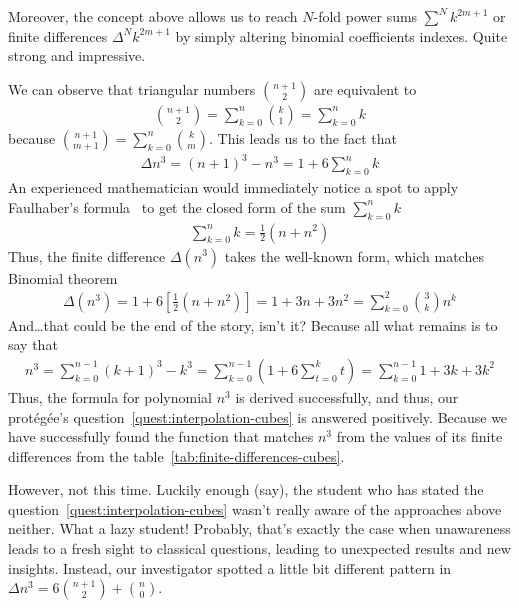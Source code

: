 Moreover, the concept above allows us to reach $N$-fold power sums $\sum^N k^{2m+1}$
or finite differences $\Delta^N k^{2m+1}$ by simply altering
binomial coefficients indexes.
Quite strong and impressive.

We can observe that triangular numbers $\binom{n+1}{2}$ are equivalent to
\begin{align*}
    \binom{n+1}{2} = \sum_{k=0}^{n} \binom{k}{1} = \sum_{k=0}^{n} k
\end{align*}
because $\binom{n+1}{m+1} = \sum_{k=0}^{n} \binom{k}{m}$.
This leads us to the fact that
\begin{align*}
    \Delta n^3 = (n+1)^3 - n^3 = 1 + 6 \sum_{k=0}^{n} k
\end{align*}
An experienced mathematician would immediately notice a spot to apply Faulhaber's formula~\cite{beardon1996sums}
to get the closed form of the sum $\sum_{k=0}^{n} k$
\begin{align*}
    \sum_{k=0}^{n} k = \frac{1}{2}(n+n^2)
\end{align*}
Thus, the finite difference $\Delta(n^3)$ takes the well-known form,
which matches Binomial theorem~\cite{abramowitz1988handbook}
\begin{align*}
    \Delta(n^3)
    = 1 + 6 \left[ \frac{1}{2}(n+n^2) \right]
    = 1 + 3 n + 3 n^2
    = \sum_{k=0}^{2} \binom{3}{k} n^k
\end{align*}
And\ldots that could be the end of the story, isn't it?
Because all what remains is to say that
\begin{align*}
    n^3
    = \sum_{k=0}^{n-1} (k+1)^3 - k^3
    = \sum_{k=0}^{n-1} \left( 1 + 6 \sum_{t=0}^{k} t \right)
    = \sum_{k=0}^{n-1} 1 + 3 k + 3 k^2
\end{align*}
Thus, the formula for polynomial $n^3$ is derived successfully, and thus,
our protégée's question~\eqref{quest:interpolation-cubes} is answered positively.
Because we have successfully found the function that matches $n^3$ from the values of its finite differences from the
table~\eqref{tab:finite-differences-cubes}.

However, not this time.
Luckily enough (say), the student who has stated the question~\eqref{quest:interpolation-cubes}
wasn't really aware of the approaches above neither.
What a lazy student!
Probably, that's exactly the case when unawareness leads to a fresh sight to classical questions,
leading to unexpected results and new insights.
Instead, our investigator spotted a little bit different pattern in $\Delta n^3= 6 \binom{n+1}{2} + \binom{n}{0}$.

